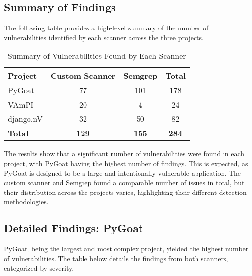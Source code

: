 \subsection{Summary of Findings}

The following table provides a high-level summary of the number of vulnerabilities identified by each scanner across the three projects.

\begin{table}[h!]
\centering
\caption{Summary of Vulnerabilities Found by Each Scanner}
\label{tab:summary_findings}
\begin{tabular}{|l|c|c|c|}
\hline
\textbf{Project} & \textbf{Custom Scanner} & \textbf{Semgrep} & \textbf{Total} \\
\hline
PyGoat & 77 & 101 & 178 \\
\hline
VAmPI & 20 & 4 & 24 \\
\hline
django.nV & 32 & 50 & 82 \\
\hline
\textbf{Total} & \textbf{129} & \textbf{155} & \textbf{284} \\
\hline
\end{tabular}
\end{table}

The results show that a significant number of vulnerabilities were found in each project, with PyGoat having the highest number of findings. This is expected, as PyGoat is designed to be a large and intentionally vulnerable application. The custom scanner and Semgrep found a comparable number of issues in total, but their distribution across the projects varies, highlighting their different detection methodologies.

\subsection{Detailed Findings: PyGoat}

PyGoat, being the largest and most complex project, yielded the highest number of vulnerabilities. The table below details the findings from both scanners, categorized by severity.

